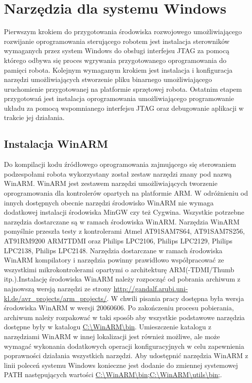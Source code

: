 \section{Narzędzia dla systemu Windows}
Pierwszym krokiem do przygotowania środowiska rozwojowego umożliwiającego
rozwijanie oprogramowania sterującego robotem jest instalacja sterowników
wymaganych przez system Windows do obsługi interfejsu JTAG za pomocą którego
odbywa się proces wgrywania przygotowanego oprogramowania do pamięci robota.
Kolejnym wymaganym krokiem jest instalacja i konfiguracja narzędzi
umożliwiających stworzenie pliku binarnego umożliwiającego uruchomienie
przygotowanej na platformie sprzętowej robota. Ostatnim etapem przygotowań jest
instalacja oprogramowania umożliwiającego programowanie układu za pomocą
wspomnianego interfejsu JTAG oraz debugowanie aplikacji w trakcie jej działania.
\subsection{Instalacja WinARM}
Do kompilacji kodu źródłowego oprogramowania zajmującego się sterowaniem
podzespołami robota wykorzystany został zestaw narzędzi znany pod nazwą WinARM.
WinARM jest zestawem narzędzi umożliwiających tworzenie oprogramowania dla
kontrolerów opartych na platformie ARM. W odróżnieniu od innych dostępnych
obecnie narzędzi środowisko WinARM nie wymaga dodatkowej instalacji środowiska
MinGW czy też Cygwina. Wszystkie potrzebne narzędzia dostarczane są w ramach
środowiska WinARM. Narzędzia WinARM pomyślnie przeszła testy z kontrolerami Atmel
AT91SAM7S64, AT91SAM7S256, AT91RM9200 ARM7TDMI oraz Philips LPC2106, Philips
LPC2129, Philips LPC2138, Philips LPC2148. Narzędzia dostarczane w ramach
środowiska WinARM kompilatory i narzędzia powinny prawidłowo współpracować ze
wszystkimi mikrokontrolerami opartymi o architekturę ARM(-TDMI/Thumb
itp.).\newline \newline Instalację środowiska WinARM należy rozpocząć od pobrania
archiwum z najnowszą wersją narzędzi ze strony
\url{http://gandalf.arubi.uni-kl.de/avr_projects/arm_projects/}. W chwili pisania
pracy dostępna była wersja środowiska WinARM w wersji 20060606. Po zakończeniu
procesu pobierania, archiwum należy rozpakować w taki sposób aby wszystkie
podstawowe narzędzia dostępne były w katalogu \url{C:\WinARM\bin}. Umieszczenie
katalogu z narzędziami WinARM w innej lokalizacji jest również możliwe, ale może
wymagać wykonania dodatkowych operacji konfiguracyjnych w celu zapewnienia
poprawności działania wszystkich narzędzi. Aby udostępnić narzędzia WinARM z
linii poleceń systemu Windows konieczne jest dodanie do zmiennej systemowej PATH
następujących wartości \url{C:\WinARM\bin;C:\WinARM\utils\bin;}.
